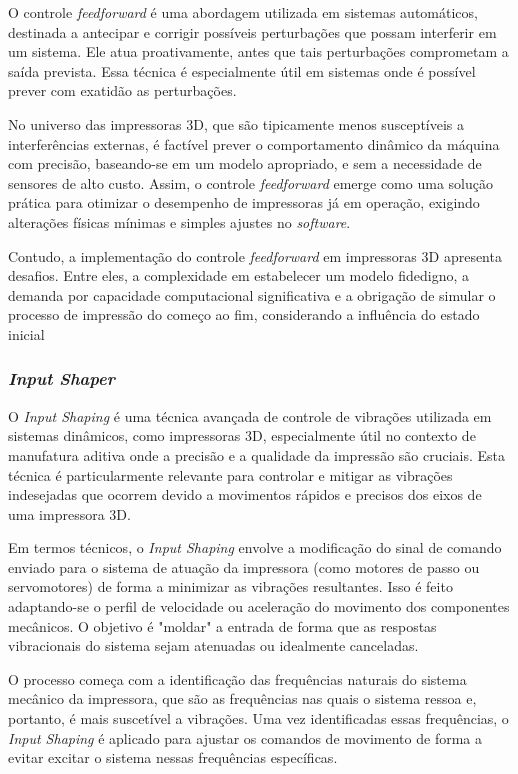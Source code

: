 O controle \textit{feedforward} é uma abordagem utilizada em sistemas automáticos, destinada a antecipar e corrigir possíveis perturbações que possam interferir em um sistema. Ele atua proativamente, antes que tais perturbações comprometam a saída prevista. Essa técnica é especialmente útil em sistemas onde é possível prever com exatidão as perturbações.

No universo das impressoras 3D, que são tipicamente menos susceptíveis a interferências externas, é factível prever o comportamento dinâmico da máquina com precisão, baseando-se em um modelo apropriado, e sem a necessidade de sensores de alto custo. Assim, o controle \textit{feedforward} emerge como uma solução prática para otimizar o desempenho de impressoras já em operação, exigindo alterações físicas mínimas e simples ajustes no \textit{software}.

Contudo, a implementação do controle \textit{feedforward} em impressoras 3D apresenta desafios. Entre eles, a complexidade em estabelecer um modelo fidedigno, a demanda por capacidade computacional significativa e a obrigação de simular o processo de impressão do começo ao fim, considerando a influência do estado inicial \cite{ramani20,duan18}

\subsubsection{\textit{Input Shaper}}
O \textit{Input Shaping} é uma técnica avançada de controle de vibrações utilizada em sistemas dinâmicos, como impressoras 3D, especialmente útil no contexto de manufatura aditiva onde a precisão e a qualidade da impressão são cruciais. Esta técnica é particularmente relevante para controlar e mitigar as vibrações indesejadas que ocorrem devido a movimentos rápidos e precisos dos eixos de uma impressora 3D.

Em termos técnicos, o \textit{Input Shaping} envolve a modificação do sinal de comando enviado para o sistema de atuação da impressora (como motores de passo ou servomotores) de forma a minimizar as vibrações resultantes. Isso é feito adaptando-se o perfil de velocidade ou aceleração do movimento dos componentes mecânicos. O objetivo é "moldar" a entrada de forma que as respostas vibracionais do sistema sejam atenuadas ou idealmente canceladas.

O processo começa com a identificação das frequências naturais do sistema mecânico da impressora, que são as frequências nas quais o sistema ressoa e, portanto, é mais suscetível a vibrações. Uma vez identificadas essas frequências, o \textit{Input Shaping} é aplicado para ajustar os comandos de movimento de forma a evitar excitar o sistema nessas frequências específicas.

